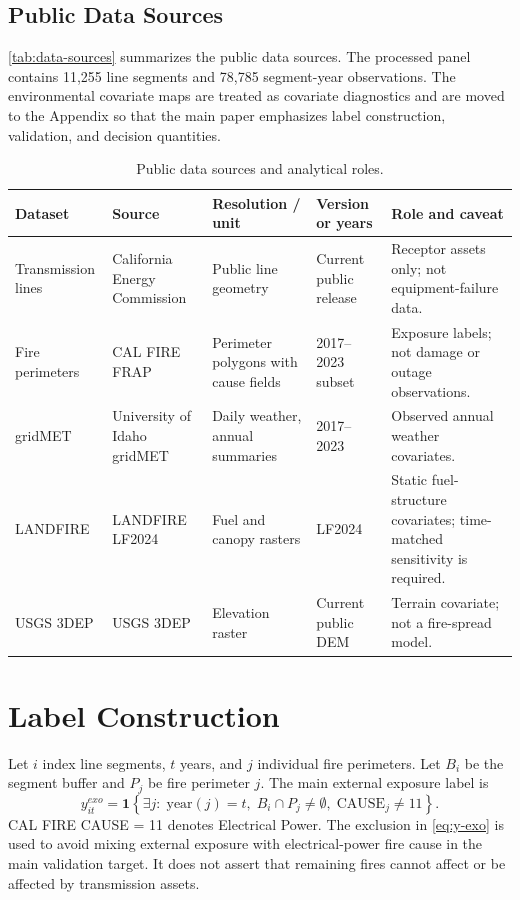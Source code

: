 \documentclass[11pt]{article}
\newcommand{\ind}{\mathbf{1}}
\begin{document}
\subsection{Public Data Sources}

\autoref{tab:data-sources} summarizes the public data sources. The processed
panel contains 11,255 line segments and 78,785 segment-year observations. The
environmental covariate maps are treated as covariate diagnostics and are moved
to the Appendix so that the main paper emphasizes label construction,
validation, and decision quantities.

\begin{table}[!htbp]
  \centering
  \footnotesize
  \setlength{\tabcolsep}{3pt}
  \caption{Public data sources and analytical roles.}
  \label{tab:data-sources}
  \begin{tabular}{L{0.16\textwidth} L{0.18\textwidth} L{0.16\textwidth} L{0.14\textwidth} L{0.25\textwidth}}
    \toprule
    Dataset & Source & Resolution / unit & Version or years & Role and caveat \\
    \midrule
    Transmission lines & California Energy Commission & Public line geometry & Current public release & Receptor assets only; not equipment-failure data. \\
    Fire perimeters & CAL FIRE FRAP & Perimeter polygons with cause fields & 2017--2023 subset & Exposure labels; not damage or outage observations. \\
    gridMET & University of Idaho gridMET & Daily weather, annual summaries & 2017--2023 & Observed annual weather covariates. \\
    LANDFIRE & LANDFIRE LF2024 & Fuel and canopy rasters & LF2024 & Static fuel-structure covariates; time-matched sensitivity is required. \\
    USGS 3DEP & USGS 3DEP & Elevation raster & Current public DEM & Terrain covariate; not a fire-spread model. \\
    \bottomrule
  \end{tabular}
\end{table}

\section{Label Construction}

Let $i$ index line segments, $t$ years, and $j$ individual fire perimeters.
Let $B_i$ be the segment buffer and $P_j$ be fire perimeter $j$. The main
external exposure label is
\begin{equation}
  y^{exo}_{it}
  =
  \ind\left\{
  \exists j:\; \mathrm{year}(j)=t,\;
  B_i \cap P_j \neq \emptyset,\;
  \mathrm{CAUSE}_j \neq 11
  \right\}.
  \label{eq:y-exo}
\end{equation}
CAL FIRE CAUSE = 11 denotes Electrical Power. The exclusion in
\autoref{eq:y-exo} is used to avoid mixing external exposure with
electrical-power fire cause in the main validation target. It does not assert
that remaining fires cannot affect or be affected by transmission assets.
\end{document}

